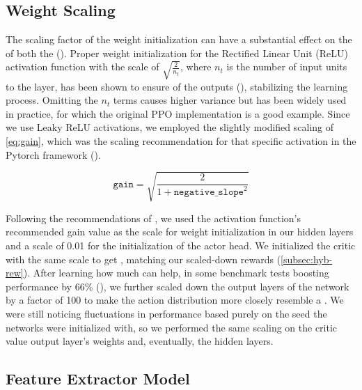 \subsection{Weight Scaling}
\label{subsec:weight-scaling}

\noindent The scaling factor of the weight initialization can have a substantial effect on the  of both the  (\cite{pmlr-v9-glorot10a}). Proper weight initialization for the Rectified Linear Unit (ReLU) activation function with the scale of $\sqrt{\frac{2}{n_t}}$, where $n_t$ is the number of input units to the layer, has been shown to ensure  of the outputs (\cite{DBLP:journals/corr/HeZR015}), stabilizing the learning process. Omitting the $n_t$ terms causes higher variance but has been widely used in practice, for which the original PPO implementation is a good example. Since we use Leaky ReLU activations, we employed the slightly modified scaling of \autoref{eq:gain}, which was the scaling recommendation for that specific activation in the Pytorch framework (\cite{pytorchinit}).

\begin{equation}
    \texttt{gain} = \sqrt{\frac{2}{1+\texttt{negative\_slope}^2}}
\label{eq:gain}
\end{equation}

\bigskip

\noindent Following the recommendations of \cite{shengyi2022the37implementation}, we used the activation function's recommended gain value as the scale for weight initialization in our hidden layers and a scale of 0.01 for the initialization of the actor head. We initialized the critic with the same scale to get , matching our scaled-down rewards (\autoref{subsec:hyb-rew}). After learning how much  can help, in some benchmark tests boosting performance by 66\% (\cite{andrychowicz2020matters}), we further scaled down the output layers of the network by a factor of 100 to make the action distribution more closely resemble a . We were still noticing fluctuations in performance based purely on the seed the networks were initialized with, so we performed the same scaling on the critic value output layer's weights and, eventually, the hidden layers.

\subsection{Feature Extractor Model}
\label{sec:monolithic-network}

